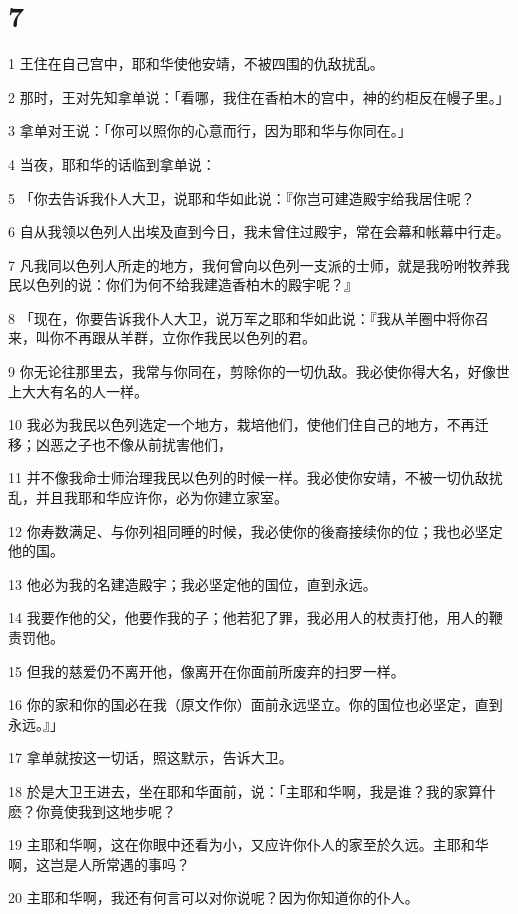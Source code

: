 \chapter{7}

\par 1 王住在自己宫中，耶和华使他安靖，不被四围的仇敌扰乱。
\par 2 那时，王对先知拿单说：「看哪，我住在香柏木的宫中，神的约柜反在幔子里。」
\par 3 拿单对王说：「你可以照你的心意而行，因为耶和华与你同在。」
\par 4 当夜，耶和华的话临到拿单说：
\par 5 「你去告诉我仆人大卫，说耶和华如此说：『你岂可建造殿宇给我居住呢？
\par 6 自从我领以色列人出埃及直到今日，我未曾住过殿宇，常在会幕和帐幕中行走。
\par 7 凡我同以色列人所走的地方，我何曾向以色列一支派的士师，就是我吩咐牧养我民以色列的说：你们为何不给我建造香柏木的殿宇呢？』
\par 8 「现在，你要告诉我仆人大卫，说万军之耶和华如此说：『我从羊圈中将你召来，叫你不再跟从羊群，立你作我民以色列的君。
\par 9 你无论往那里去，我常与你同在，剪除你的一切仇敌。我必使你得大名，好像世上大大有名的人一样。
\par 10 我必为我民以色列选定一个地方，栽培他们，使他们住自己的地方，不再迁移；凶恶之子也不像从前扰害他们，
\par 11 并不像我命士师治理我民以色列的时候一样。我必使你安靖，不被一切仇敌扰乱，并且我耶和华应许你，必为你建立家室。
\par 12 你寿数满足、与你列祖同睡的时候，我必使你的後裔接续你的位；我也必坚定他的国。
\par 13 他必为我的名建造殿宇；我必坚定他的国位，直到永远。
\par 14 我要作他的父，他要作我的子；他若犯了罪，我必用人的杖责打他，用人的鞭责罚他。
\par 15 但我的慈爱仍不离开他，像离开在你面前所废弃的扫罗一样。
\par 16 你的家和你的国必在我（原文作你）面前永远坚立。你的国位也必坚定，直到永远。』」
\par 17 拿单就按这一切话，照这默示，告诉大卫。
\par 18 於是大卫王进去，坐在耶和华面前，说：「主耶和华啊，我是谁？我的家算什麽？你竟使我到这地步呢？
\par 19 主耶和华啊，这在你眼中还看为小，又应许你仆人的家至於久远。主耶和华啊，这岂是人所常遇的事吗？
\par 20 主耶和华啊，我还有何言可以对你说呢？因为你知道你的仆人。
